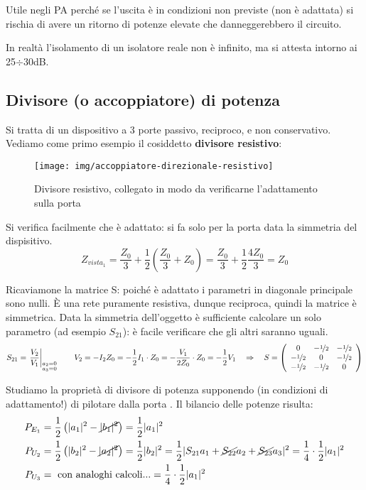 Utile negli PA perché se l'uscita è in condizioni non previste (non è adattata) si rischia di avere un ritorno di potenze elevate che danneggerebbero il circuito.


In realtà l'isolamento di un isolatore reale non è infinito, ma si attesta intorno ai 25$\div$30dB.


\subsection{Divisore (o accoppiatore) di potenza}
Si tratta di un dispositivo a 3 porte passivo, reciproco, e non conservativo. Vediamo come primo esempio il cosiddetto \textbf{divisore resistivo}:

\begin{figure}[htb]
	\centering
	\texttt{[image: img/accoppiatore-direzionale-resistivo]}
	\caption{Divisore resistivo, collegato in modo da verificarne l'adattamento sulla porta }
	\label{fig:accoppiatore-direzionale-resistivo}
\end{figure}

Si verifica facilmente che è adattato: si fa solo per la porta  data la simmetria del dispisitivo.
\[
Z_{vista_1} = \frac{Z_0}{3} + \frac{1}{2} \left(\frac{Z_0}{3} + Z_0\right) =
\frac{Z_0}{3} + \frac{1}{2} \frac{4Z_0}{3} =
Z_0
\]

Ricaviamone la matrice S: poiché è adattato i parametri in diagonale principale sono nulli. È una rete puramente resistiva, dunque reciproca, quindi la matrice è simmetrica. Data la simmetria dell'oggetto è sufficiente calcolare un solo parametro (ad esempio $S_{21}$): è facile verificare che gli altri saranno uguali.
\[
S_{21} = \left. \frac{V_2}{V_1}\right|_
{\substack{a_2=0\\a_3=0}}
\qquad
V_2 = -I_2 Z_0 = -\frac{1}{2} I_1 \cdot Z_0
=-\frac{V_1}{2Z_0} \cdot Z_0 = -\frac{1}{2}V_1
\quad
\Rightarrow
\quad
S = \left(
\begin{array}{ccc}
0                 & -\nicefrac{1}{2} & -\nicefrac{1}{2}\\
-\nicefrac{1}{2}  &         0        & -\nicefrac{1}{2}\\
-\nicefrac{1}{2}  & -\nicefrac{1}{2} & 0
\end{array}
\right)
\]


Studiamo la proprietà di divisore di potenza supponendo (in condizioni di adattamento!) di pilotare dalla porta . Il bilancio delle potenze risulta:
\begin{align*}
P_{E_1} &= \frac{1}{2} \left( |a_1|^2 -\cancel{|b_1|^2} \right) =\frac{1}{2}|a_1|^2\\
P_{U_2} &= \frac{1}{2} \left(|b_2|^2 -\cancel{|a_2|^2}\right)=
\frac{1}{2}|b_2|^2 =
\frac{1}{2}|S_{21}a_1 + \cancel{S_{22}}a_2 + \cancel{S_{23}}a_3|^2 =
\frac{1}{4}\cdot \frac{1}{2} |a_1|^2\\
P_{U_3} &= \mbox{ con analoghi calcoli...} = \frac{1}{4}\cdot \frac{1}{2} |a_1|^2
\end{align*}

